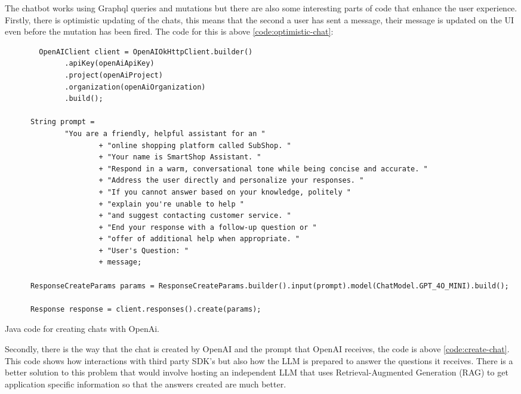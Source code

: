 \documentclass[]{project_report}
\begin{document}
The chatbot works using Graphql queries and mutations but there are also some interesting parts of code that enhance the user experience. Firstly, there is optimistic updating of the chats, this means that the second a user has sent a message, their message is updated on the UI even before the mutation has been fired. The code for this is above \ref{code:optimistic-chat}:

\begin{codeblock}[H]
    \begin{verbatim}
        OpenAIClient client = OpenAIOkHttpClient.builder()
              .apiKey(openAiApiKey)
              .project(openAiProject)
              .organization(openAiOrganization)
              .build();

      String prompt =
              "You are a friendly, helpful assistant for an "
                      + "online shopping platform called SubShop. "
                      + "Your name is SmartShop Assistant. "
                      + "Respond in a warm, conversational tone while being concise and accurate. "
                      + "Address the user directly and personalize your responses. "
                      + "If you cannot answer based on your knowledge, politely "
                      + "explain you're unable to help "
                      + "and suggest contacting customer service. "
                      + "End your response with a follow-up question or "
                      + "offer of additional help when appropriate. "
                      + "User's Question: "
                      + message;

      ResponseCreateParams params = ResponseCreateParams.builder().input(prompt).model(ChatModel.GPT_4O_MINI).build();

      Response response = client.responses().create(params);
\end{verbatim}
    \caption{Java code for creating chats with OpenAi.}
    \label{code:create-chat}
\end{codeblock}

Secondly, there is the way that the chat is created by OpenAI and the prompt that OpenAI receives, the code is above \ref{code:create-chat}. This code shows how interactions with third party SDK's but also how the LLM is prepared to answer the questions it receives. There is a better solution to this problem that would involve hosting an independent LLM that uses Retrieval-Augmented Generation (RAG) to get application specific information so that the answers created are much better.
\end{document}
